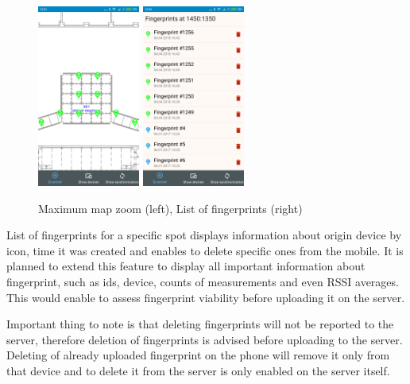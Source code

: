\begin{figure}[h!]
	\begin{centering}
		\includegraphics[width=0.30\textwidth]{img/map_zoom}
		\hspace{0.2cm}
		\includegraphics[width=0.30\textwidth]{img/map_list_fingerprints}
		\par\end{centering}
	\caption{Maximum map zoom (left), List of fingerprints (right)\label{fig:map_zoom_and_list}}
	\label{fig06c05}
\end{figure}

List of fingerprints for a specific spot displays information about origin device by icon, time it was created and enables to delete specific ones from the mobile. It is planned to extend this feature to display all important information about fingerprint, such as ids, device, counts of measurements and even RSSI averages. This would enable to assess fingerprint viability before uploading it on the server.

Important thing to note is that deleting fingerprints will not be reported to the server, therefore deletion of fingerprints is advised before uploading to the server. Deleting of already uploaded fingerprint on the phone will remove it only from that device and to delete it from the server is only enabled on the server itself. 

